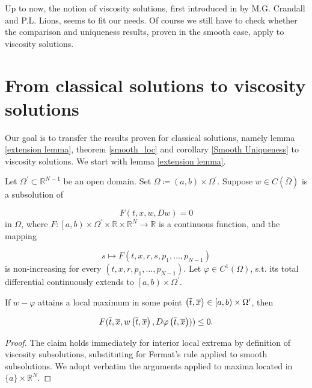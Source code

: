 	Up to now, the notion of viscosity solutions, first introduced in \cite{lions} by M.G. Crandall and P.L. Lions, seems to fit our needs. Of course we still have to check whether the comparison and uniqueness results, proven in the smooth case, apply to viscosity solutions.
	
	\section{From classical solutions to viscosity solutions}
	Our goal is to transfer the results proven for classical solutions, namely lemma \ref{extension lemma}, theorem \ref{smooth_loc} and corollary \ref{Smooth Uniqueness} to viscosity solutions. We start with lemma \ref{extension lemma}.
	
	\begin{lemma}
		\label{extension lemma viscosity}
		Let $ \Omega^{\prime} \subset \mathbb{R}^{N-1} $ be an open domain. Set $ \Omega \coloneqq \left( a, b \right) \times \Omega^{\prime} $. Suppose $ w \in C (\overline{\Omega})$ is a subsolution of
		
		\begin{equation*}
		F(t, x, w, Dw) = 0
		\end{equation*}
		in $ \Omega $, where $ F : \left[ a, b \right) \times \Omega^{\prime} \times \mathbb{R} \times \mathbb{R}^{N} \to \mathbb{R} $ is a continuous function, and the mapping
		
		\begin{equation*}
		s \mapsto F(t, x, r, s, p_1, \ldots, p_{N-1})
		\end{equation*}
		is non-increasing for every $ (t, x, r, p_1, \ldots, p_{N-1}) $. Let $ \varphi \in C^{1} \left( \Omega \right) $, s.t. its total differential continuously extends to $ \left[a, b\right) \times \Omega^{\prime} $.
		
		If $ w - \varphi $ attains a local maximum in some point $ \left(\overline{t}, \overline{x}\right) \in \left[a, b\right) \times \Omega^{\prime} $, then
		
		\begin{equation*}
		F(\overline{t}, \overline{x}, w\left(\overline{t}, \overline{x}\right), D\varphi\left(\overline{t}, \overline{x}\right))) \leq 0.
		\end{equation*}
		
		\begin{proof}
			The claim holds immediately for interior local extrema by definition of viscosity subsolutions, substituting for Fermat's rule applied to smooth subsolutions. We adopt verbatim the arguments applied to maxima located in $ \{a\} \times \mathbb{R}^N $.
		\end{proof}
	\end{lemma}

